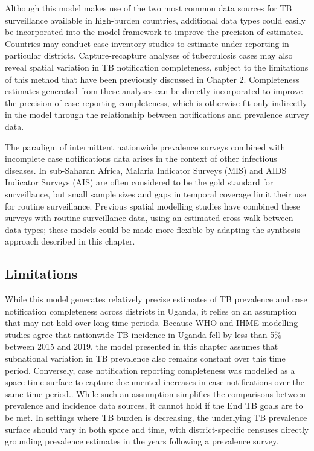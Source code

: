 \documentclass[
]{report}
\begin{document}
Although this model makes use of the two most common data sources for TB surveillance available in high-burden countries, additional data types could easily be incorporated into the model framework to improve the precision of estimates. Countries may conduct case inventory studies to estimate under-reporting in particular districts.\autocite{Glaziou2018a} Capture-recapture analyses of tuberculosis cases may also reveal spatial variation in TB notification completeness, subject to the limitations of this method that have been previously discussed in Chapter 2.\autocite{Hook1995,VanHest2011} Completeness estimates generated from these analyses can be directly incorporated to improve the precision of case reporting completeness, which is otherwise fit only indirectly in the model through the relationship between notifications and prevalence survey data.

The paradigm of intermittent nationwide prevalence surveys combined with incomplete case notifications data arises in the context of other infectious diseases. In sub-Saharan Africa, Malaria Indicator Surveys (MIS) and AIDS Indicator Surveys (AIS) are often considered to be the gold standard for surveillance, but small sample sizes and gaps in temporal coverage limit their use for routine surveillance. Previous spatial modelling studies have combined these surveys with routine surveillance data, using an estimated cross-walk between data types;\autocite{Dwyer-Lindgren2019,Lucas2019} these models could be made more flexible by adapting the synthesis approach described in this chapter.

\hypertarget{limitations-1}{%
\subsection{Limitations}\label{limitations-1}}

While this model generates relatively precise estimates of TB prevalence and case notification completeness across districts in Uganda, it relies on an assumption that may not hold over long time periods. Because WHO and IHME modelling studies agree that nationwide TB incidence in Uganda fell by less than 5\% between 2015 and 2019,\autocite{WorldHealthOrganization2019,Ledesma2021} the model presented in this chapter assumes that subnational variation in TB prevalence also remains constant over this time period. Conversely, case notification reporting completeness was modelled as a space-time surface to capture documented increases in case notifications over the same time period.\autocite{UgandaNationalTuberculosisandLeprosyProgramme2017b,UgandaNationalTuberculosisandLeprosyProgramme2020}. While such an assumption simplifies the comparisons between prevalence and incidence data sources, it cannot hold if the End TB goals are to be met. In settings where TB burden is decreasing, the underlying TB prevalence surface should vary in both space and time, with district-specific censuses directly grounding prevalence estimates in the years following a prevalence survey.
\end{document}
